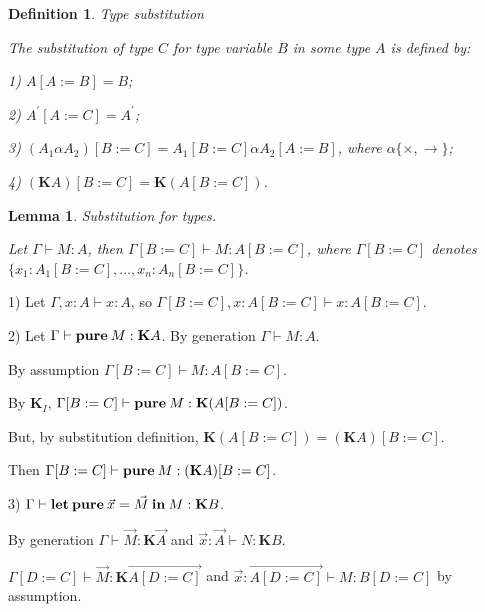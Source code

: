 \documentclass[a4paper]{article}
\newtheorem{lemma}{Lemma}
\newtheorem{defin}{Definition}
\begin{document}
  \vspace{\baselineskip}

  \begin{defin} Type substitution

    The substitution of type $C$ for type variable $B$ in some type $A$ is defined by:

    1) $A [ A := B ] = B$;

    2) $A^{'} [A := C] = A^{'}$;

    3) $(A_1 \alpha A_2) [B := C] = A_1 [B := C] \alpha A_2 [A := B]$, where $\alpha \{ \times, \to \}$;

    4) $(\textbf{K}A) [B := C] = \textbf{K}(A [B := C])$.

  \end{defin}

    \vspace{\baselineskip}

  \begin{lemma} Substitution for types.

    Let $\Gamma \vdash M : A$, then $\Gamma [B := C] \vdash M : A [B := C]$, where $\Gamma [B := C]$ denotes $\{ x_1 : A_1 [B := C],\dots, x_n : A_n [B := C] \}$.

  \end{lemma}

  1) Let $\Gamma, x : A \vdash x : A$, so $\Gamma [B := C], x : A [B := C] \vdash x : A [B := C]$.

  \vspace{\baselineskip}

  2) Let $\Gamma \vdash {\bf pure \: } M : \textbf{K}A$. By generation $\Gamma \vdash M : A$.

  By assumption $\Gamma [B := C] \vdash M : A [B := C]$.

  By $\textbf{K}_I$, $\Gamma [B := C] \vdash {\bf pure \:} M : \textbf{K} (A [B := C])$.

  But, by substitution definition, $\textbf{K} (A [B := C]) = (\textbf{K}A) [B := C]$.

  Then $\Gamma [B := C] \vdash {\bf pure \:} M : (\textbf{K}A) [B := C]$.

  3) $\Gamma \vdash {\bf let \: pure} \: \vec{x} = \vec{M} \: {\bf in} \: M : {\bf K} B$.

  By generation $\Gamma \vdash \vec{M} : \textbf{K}\vec{A}$ and $\vec{x} : \vec{A} \vdash N : \textbf{K}B$.

  $\Gamma [D := C] \vdash \vec{M} : \textbf{K}\overrightarrow{A [D := C]}$ and $\vec{x} : \overrightarrow{A [D := C]} \vdash M : B [D := C]$ by assumption.
\end{document}
